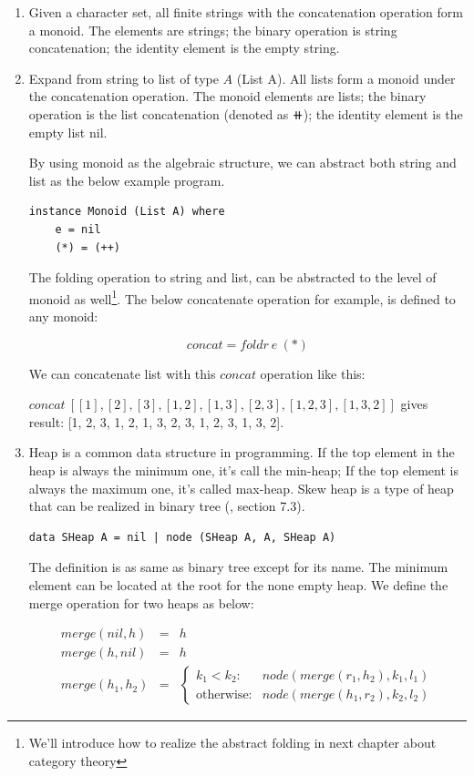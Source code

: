 \documentclass{article}
\begin{document}
\begin{enumerate}
\item Given a character set, all finite strings with the concatenation operation form a monoid. The elements are strings; the binary operation is string concatenation; the identity element is the empty string.
\item Expand from string to list of type $A$ (List A). All lists form a monoid under the concatenation operation. The monoid elements are lists; the binary operation is the list concatenation (denoted as $\doubleplus$); the identity element is the empty list nil.

By using monoid as the algebraic structure, we can abstract both string and list as the below example program.

\begin{lstlisting}
instance Monoid (List A) where
    e = nil
    (*) = (++)
\end{lstlisting}

The folding operation to string and list, can be abstracted to the level of monoid as well\footnote{We'll introduce how to realize the abstract folding in next chapter about category theory}. The below concatenate operation for example, is defined to any monoid:

\[
concat = foldr\ e\ (*)
\]

We can concatenate list with this $concat$ operation like this:

$concat\ [[1], [2], [3], [1, 2], [1, 3], [2, 3], [1, 2, 3], [1, 3, 2]]$ gives result: [1, 2, 3, 1, 2, 1, 3, 2, 3, 1, 2, 3, 1, 3, 2].

\item Heap is a common data structure in programming. If the top element in the heap is always the minimum one, it's call the min-heap; If the top element is always the maximum one, it's called max-heap. Skew heap is a type of heap that can be realized in binary tree (\cite{LiuXinyu2017}, section 7.3).

\begin{lstlisting}
data SHeap A = nil | node (SHeap A, A, SHeap A)
\end{lstlisting}

The definition is as same as binary tree except for its name. The minimum element can be located at the root for the none empty heap. We define the merge operation for two heaps as below:

\[
\begin{array}{rcl}
merge(nil, h) & = & h \\
merge(h, nil) & = & h \\
merge(h_1, h_2) & = &
  \begin{cases}
  k_1 < k_2 : & node(merge(r_1, h_2), k_1, l_1) \\
  \text{otherwise}: & node(merge(h_1, r_2), k_2, l_2)
  \end{cases}
\end{array}
\]


\end{enumerate}
\end{document}
